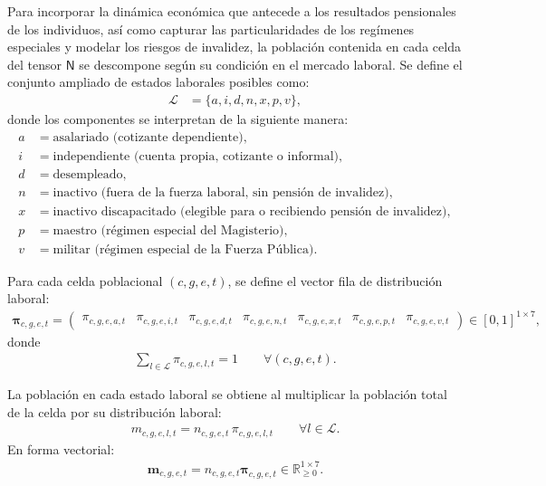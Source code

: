 \documentclass[11pt]{article}
\begin{document}
Para incorporar la dinámica económica que antecede a los resultados pensionales de los individuos, así como capturar las particularidades de los regímenes especiales y modelar los riesgos de invalidez, la población contenida en cada celda del tensor \(\mathsf{N}\) se descompone según su condición en el mercado laboral. Se define el conjunto ampliado de estados laborales posibles como:
\begin{align*}
\mathcal{L} &= \{a, i, d, n, x, p, v\},
\end{align*}
donde los componentes se interpretan de la siguiente manera:
\begin{align*}
a &= \text{asalariado (cotizante dependiente)}, \\
i &= \text{independiente (cuenta propia, cotizante o informal)}, \\
d &= \text{desempleado}, \\
n &= \text{inactivo (fuera de la fuerza laboral, sin pensión de invalidez)}, \\
x &= \text{inactivo discapacitado (elegible para o recibiendo pensión de invalidez)}, \\
p &= \text{maestro (régimen especial del Magisterio)}, \\
v &= \text{militar (régimen especial de la Fuerza Pública)}.
\end{align*}

Para cada celda poblacional \((c,g,e,t)\), se define el vector fila de distribución laboral:
\begin{align*}
\boldsymbol{\pi}_{c,g,e,t}
=
\begin{pmatrix}
\pi_{c,g,e,a,t} &
\pi_{c,g,e,i,t} &
\pi_{c,g,e,d,t} &
\pi_{c,g,e,n,t} &
\pi_{c,g,e,x,t} &
\pi_{c,g,e,p,t} &
\pi_{c,g,e,v,t}
\end{pmatrix}
\in [0,1]^{1\times 7},
\end{align*}
donde
\begin{align*}
\sum_{l\in\mathcal{L}} \pi_{c,g,e,l,t}=1
\qquad
\forall (c,g,e,t).
\end{align*}

La población en cada estado laboral se obtiene al multiplicar la población total de la celda por su distribución laboral:
\begin{align*}
m_{c,g,e,l,t}
=
n_{c,g,e,t}\,\pi_{c,g,e,l,t}
\qquad
\forall l\in\mathcal{L}.
\end{align*}
En forma vectorial:
\begin{align*}
\mathbf{m}_{c,g,e,t}
=
n_{c,g,e,t}\boldsymbol{\pi}_{c,g,e,t}
\in
\mathbb{R}_{\geq 0}^{1\times 7}.
\end{align*}
\end{document}
